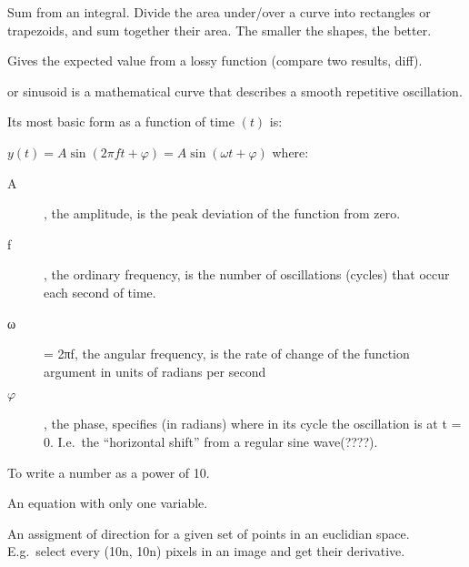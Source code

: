 \begin{definition}
    Sum from an integral. Divide the area under/over a curve into rectangles
    or trapezoids, and sum together their area. The smaller the shapes, the
    better.
\end{definition}

\begin{definition}
    Gives the expected value from a lossy function (compare two results, diff).
\end{definition}

\begin{definition}
or sinusoid is a mathematical curve that describes a smooth repetitive
oscillation.

Its most basic form as a function of time $(t)$ is:

$y(t) = A\sin(2 \pi f t + \varphi) = A\sin(\omega t + \varphi)$
where:
\begin{description}
    \item[A], the amplitude, is the peak deviation of the function from zero.
    \item[f], the ordinary frequency, is the number of oscillations (cycles)
        that occur each second of time.
    \item[ω] = 2πf, the angular frequency, is the rate of change of the
    function argument in units of radians per second 
    \item[$\varphi$], the phase, specifies (in radians) where in its cycle the
        oscillation is at t = 0. I.e.\ the ``horizontal shift'' from a regular
        sine wave(????).
\end{description}

\end{definition}

\begin{definition}
    To write a number as a power of 10.
\end{definition}

\begin{definition}[Univariate]
    An equation with only one variable.
\end{definition}

\begin{definition}\label{vectorfield}
    An assigment of direction for a given set of points in an euclidian space.
    E.g.\ select every (10n, 10n) pixels in an image and get their derivative.
\end{definition}
